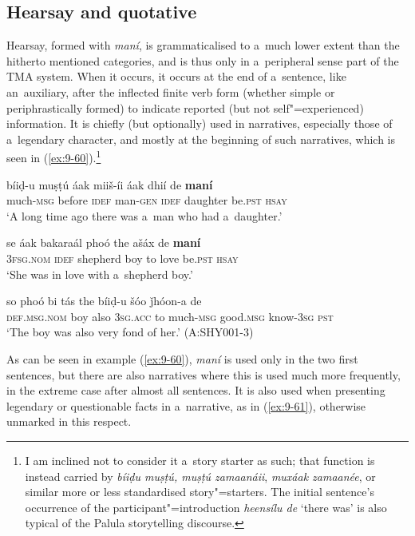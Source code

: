 \subsection{Hearsay and quotative}
\label{subsec:9-2-4}

Hearsay, formed with \textit{maní}, is grammaticalised to a~much lower extent than the hitherto mentioned categories, and is thus only in a~peripheral sense part of the TMA system. When it occurs, it occurs at the end of a~sentence, like an~auxiliary, after the inflected finite verb form (whether simple or periphrastically formed) to indicate reported (but not self"=experienced) information. It is chiefly (but optionally) used in narratives, especially those of a~legendary character, and mostly at the beginning of such narratives, which is seen in (\ref{ex:9-60}).\footnote{I am inclined not to consider it a~story starter as such; that function is instead carried by \textit{bíiḍu muṣṭú, muṣṭú zamaanáii}, \textit{muxáak zamaanée}, or similar more or less standardised story"=starters. The initial sentence's occurrence of the participant"=introduction \textit{heensílu de} `there was' is also typical of the Palula storytelling discourse.} 

\begin{exe}
\ex
\label{ex:9-60}
\gll \label{bkm:Ref190746425}bíiḍ-u muṣṭú áak miiš-íi áak dhií de \textbf{maní} \\
much-\textsc{msg} before \textsc{idef} man-\textsc{gen} \textsc{idef} daughter be.\textsc{pst}
\textsc{hsay} \\
\glt `A long time ago there was a~man who had a~daughter.' 

\gll se áak bakaraál phoó the ašáx de \textbf{maní} \\
\textsc{3fsg.nom} \textsc{idef} shepherd boy to love be.\textsc{pst} \textsc{hsay} \\
\glt `She was in love with a~shepherd boy.'

\gll so phoó bi tás the bíiḍ-u  šóo ǰhóon-a de \\
\textsc{def.msg.nom} boy also \textsc{3sg.acc} to much-\textsc{msg}  good.\textsc{msg} know-\textsc{3sg} \textsc{pst} \\
\glt `The boy was also very fond of her.' (A:SHY001-3)
\end{exe}

As can be seen in example (\ref{ex:9-60}), \textit{maní} is used only in the two first sentences, but there are also narratives where this is used much more frequently, in the extreme case after almost all sentences. It is also used when presenting legendary or questionable facts in a~narrative, as in (\ref{ex:9-61}), otherwise unmarked in this respect.

